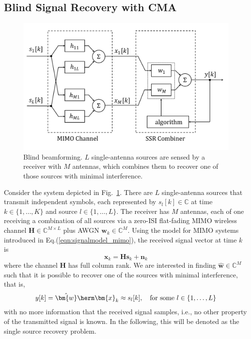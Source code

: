 \subsection{Blind Signal Recovery with CMA}\label{beamforming}
\begin{figure}
	\centering
	\includegraphics[width=0.9\linewidth]{./figs/ssr_beamforming2.pdf}
	\caption{Blind beamforming. $L$ single-antenna sources are sensed by a receiver with $M$ antennas, which combines them to recover one of those sources with minimal interference.} \label{fig:beamforming}
\end{figure}
Consider the system depicted in Fig.~\ref{fig:beamforming}. There are $L$ single-antenna sources that transmit independent symbols, each represented by $s_l[k]\in\mathbb{C}$ at time $k\in\{1,\ldots,K\}$ and source $l\in\{1,\ldots,L\}$. The receiver has $M$ antennas, each of one receiving a combination of all sources via a zero-ISI flat-fading MIMO wireless channel $\bm{H}\in\mathbb{C}^{M\times L}$ plus AWGN $\bm{w}_k\in\mathbb{C}^M$. Using the model for MIMO systems introduced in Eq.(\ref{eqn:signalmodel_mimo}), the received signal vector at time $k$ is
\begin{equation}
\bm{x}_k=\bm{H}\bm{s}_k+\bm{n}_k \label{eqn:rxsignal}
\end{equation}
where the channel $\bm{H}$ has full column rank. We are interested in finding $\bm{\hat{w}}\in\mathbb{C}^M$ such that it is possible to recover one of the sources with minimal interference, that is, 
\begin{equation}
y[k]=\hat{\bm{w}}\herm\bm{x}_k\approx{s}_l[k],\quad\text{for some}\,\,l\in\{1,\ldots,L\} \label{eqn:combineroutput}
\end{equation}
with no more information that the received signal samples, i.e., no other property of the transmitted signal is known. In the following, this will be denoted as the single source recovery problem.

